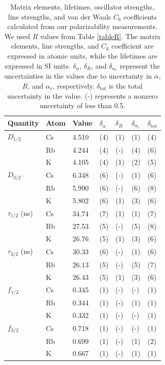 \documentclass[twocolumn,prl,showpacs,superscriptaddress]{revtex4-1}   %
\begin{document}
\begingroup
\begin{table}
\caption{\label{tableMisc}Matrix elements, lifetimes, oscillator strengths, line strengths, and van der Waals $C_6$ coefficients calculated from our polarizability measurements.
We used $R$ values from Table \ref{tableR}. The matrix elements, line strengths, and $C_6$ coefficient are expressed in atomic units, while the lifetimes are expressed in SI units.
$\delta_{\alpha}$, $\delta_{R}$, and $\delta_{\alpha_r}$ represent the uncertainties in the values due to uncertainty in $\alpha$, $R$, and $\alpha_r$, respectively. $\delta_{\mathrm{tot}}$ is the total uncertainty in the value. (-) represents a nonzero uncertainty of less than 0.5.}
\begin{center}
\begin{tabular}{lllllll}
\hline\hline
Quantity & Atom & Value & $\delta_{\alpha}$ & $\delta_{R}$ & $\delta_{\alpha_r}$ & $\delta_{\mathrm{tot}}$ \\
\hline
$D_{1/2}$ 		& Cs & 4.510 & (4) & (1) & (1) & (4) \\
 					& Rb & 4.244 & (4) & (-) & (4) & (6) \\
 					& K  & 4.105 & (4) & (1) & (2) & (5) \\ \hline
$D_{3/2}$ 		& Cs & 6.348 & (6) & (-) & (1) & (6) \\
 					& Rb & 5.990 & (6) & (-) & (6) & (8) \\
 					& K  & 5.802 & (6) & (1) & (3) & (6) \\ \hline
$\tau_{1/2}$ (ns) 	& Cs & 34.74 & (7) & (1) & (1) & (7) \\
 					& Rb & 27.53 & (5) & (-) & (5) & (8) \\
 					& K  & 26.76 & (5) & (1) & (3) & (6) \\ \hline
$\tau_{3/2}$ (ns) 	& Cs & 30.33 & (6) & (-) & (1) & (6) \\
 					& Rb & 26.13 & (5) & (-) & (5) & (7) \\
 					& K  & 26.43 & (5) & (1) & (3) & (6) \\ \hline
$f_{1/2}$ 			& Cs & 0.345 & (1) & (-) & (-) & (1) \\
 					& Rb & 0.344 & (1) & (-) & (1) & (1) \\
 					& K  & 0.332 & (1) & (-) & (-) & (1) \\ \hline
$f_{3/2}$ 			& Cs & 0.718 & (1) & (-) & (-) & (1) \\
 					& Rb & 0.699 & (1) & (-) & (1) & (2) \\
 					& K  & 0.667 & (1) & (-) & (1) & (1) \\ \hline

\end{tabular}
\end{center}
\end{table}
\end{document}
